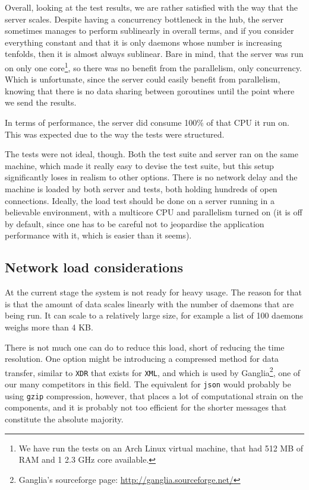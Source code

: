 \documentclass{l3proj}
\begin{document}
Overall, looking at the test results, we are rather satisfied with the way that the server scales. Despite having a concurrency bottleneck in the hub, the server sometimes manages to perform sublinearly in overall terms, and if you consider everything constant and that it is only daemons whose number is increasing tenfolds, then it is almost always sublinear. Bare in mind, that the server was run on only one core\footnote{\raggedright{}We have run the tests on an Arch Linux virtual machine, that had 512 MB of RAM and 1 2.3 GHz core available.}, so there was no benefit from the parallelism, only concurrency. Which is unfortunate, since the server could easily benefit from parallelism, knowing that there is no data sharing between goroutines until the point where we send the results.

In terms of performance, the server did consume 100\% of that CPU it run on. This was expected due to the way the tests were structured.

The tests were not ideal, though. Both the test suite and server ran on the same machine, which made it really easy to devise the test suite, but this setup significantly loses in realism to other options. There is no network delay and the machine is loaded by both server and tests, both holding hundreds of open connections. Ideally, the load test should be done on a server running in a believable environment, with a multicore CPU and parallelism turned on (it is off by default, since one has to be careful not to jeopardise the application performance with it, which is easier than it seems).

\subsection{Network load considerations}

At the current stage the system is not ready for heavy usage. The reason for that is that the amount of data scales linearly with the number of daemons that are being run. It can scale to a relatively large size, for example a list of 100 daemons weighs more than 4 KB. 

There is not much one can do to reduce this load, short of reducing the time resolution. One option might be introducing a compressed method for data transfer, similar to \texttt{XDR} that exists for \texttt{XML}, and which is used by Ganglia\footnote{\raggedright{}Ganglia's sourceforge page: \url{http://ganglia.sourceforge.net/}}, one of our many competitors in this field. The equivalent for \texttt{json} would probably be using \texttt{gzip} compression, however, that places a lot of computational strain on the components, and it is probably not too efficient for the shorter messages that constitute the absolute majority.
\end{document}
